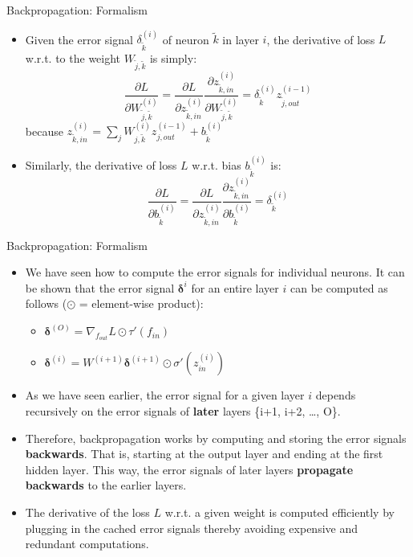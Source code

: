 \begin{frame} {Backpropagation: Formalism}
  \begin{itemize}
    \item Given the error signal $\delta_{\tilde{k}}^{(i)}$ of neuron $\tilde{k}$ in layer $i$, the derivative of loss $L$ w.r.t. to the weight $W_{\tilde{j},\tilde{k}}$ is simply:
        $$
           \frac{\partial L}{\partial W_{\tilde{j},\tilde{k}}^{(i)}} = \frac{\partial L}{\partial z_{\tilde{k},in}^{(i)}} \frac{\partial z_{\tilde{k},in}^{(i)}}{\partial W_{\tilde{j},\tilde{k}}^{(i)}} 
           = \delta_{\tilde{k}}^{(i)} z_{\tilde{j},out}^{(i-1)} $$
        because $z_{\tilde{k},in}^{(i)} = \sum_j W_{j,\tilde{k}}^{(i)}z_{j,out}^{(i-1)}  + b_{\tilde{k}}^{(i)}$
    \item Similarly, the derivative of loss $L$ w.r.t. bias $b_{\tilde{k}}^{(i)}$ is:
      $$ \frac{\partial L}{\partial b_{\tilde{k}}^{(i)}} = \frac{\partial L}{\partial z_{\tilde{k},in}^{(i)}} \frac{\partial z_{\tilde{k},in}^{(i)}}{\partial b_{\tilde{k}}^{(i)}} = \delta_{\tilde{k}}^{(i)}$$
  \end{itemize}
\end{frame}
\begin{frame} {Backpropagation: Formalism}
  \begin{itemize}
    \item We have seen how to compute the error signals for individual neurons. It can be shown that the error signal $\bm{\delta}^{i}$ for an entire layer $i$ can be computed as follows ($\odot$ = element-wise product):
      \begin{itemize}
        \item $\bm{\delta}^{(O)} = \nabla_{f_{out}}L \odot \tau'(f_{in})$
        \item $\bm{\delta}^{(i)} = W^{(i+1)}\bm{\delta}^{(i+1)} \odot \sigma'(z_{in}^{(i)})$
      \end{itemize}
    \item As we have seen earlier, the error signal for a given layer $i$ depends recursively on the error signals of \textbf{later} layers \{i+1, i+2, \ldots , O\}.
    \item Therefore, backpropagation works by computing and storing the error signals \textbf{backwards}. That is, starting at the output layer and ending at the first hidden layer. This way, the error signals of later layers \textbf{propagate backwards} to the earlier layers.
    \item The derivative of the loss $L$ w.r.t. a given weight is computed efficiently by plugging in the cached error signals thereby avoiding expensive and redundant computations. 
  \end{itemize}
\end{frame}


